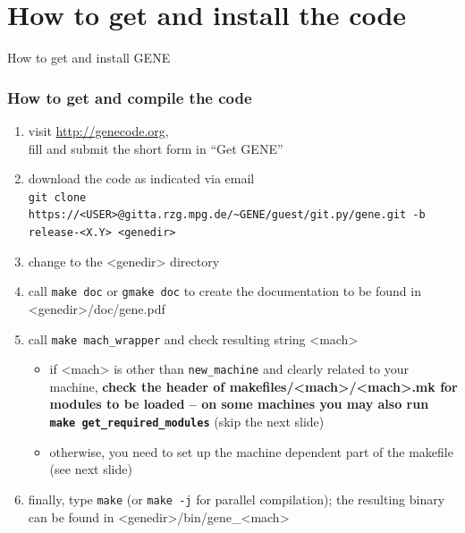 \documentclass[9pt]{beamer}
\begin{document}
\section{How to get and install the code}

\begin{frame}[plain]

\begin{center}

\begin{exampleblock}

\begin{center}
\LARGE
How to get and install GENE
\end{center}
\end{exampleblock}

\end{center}
\end{frame}


\begin{frame}
  \frametitle{How to get and compile the code}

\begin{block}{}
 \begin{enumerate}
  \item visit \url{http://genecode.org},\\
fill and submit the short form in ``Get GENE''\\[1ex]
  \item download the code as indicated via email\\
{\tt \tiny git clone https://<USER>@gitta.rzg.mpg.de/\textasciitilde GENE/guest/git.py/gene.git -b release-<X.Y> <genedir>}\\[1ex]
  \item change to the <genedir> directory\\[1ex]
  \item call {\tt make doc} or {\tt gmake doc} to create the documentation to be found in <genedir>/doc/gene.pdf\\[1ex]
  \item call {\tt make mach\_wrapper} and check resulting string <mach>
\begin{itemize}
 \item if <mach> is other than {\tt new\_machine} and clearly related to your machine, {\bf check the header of makefiles/<mach>/<mach>.mk for modules to be loaded -- on some machines you may also run {\tt make get\_required\_modules}} (skip the next slide)
 \item otherwise, you need to set up the machine dependent part of the makefile (see next slide)
\end{itemize}
 \item finally, type {\tt make} (or {\tt make -j} for parallel compilation); the resulting binary can be found in <genedir>/bin/gene\_<mach>
 \end{enumerate}
\end{block}


\end{frame}
\end{document}
